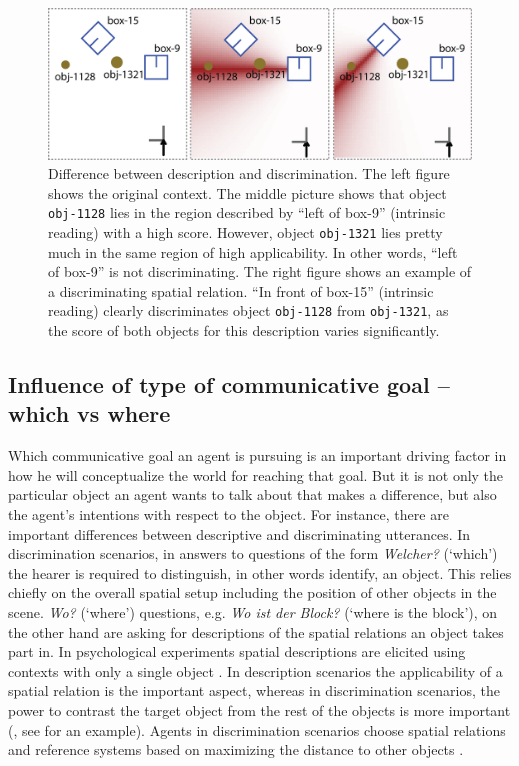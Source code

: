 \begin{figure}
\begin{centering}
\includegraphics[width=.8\columnwidth]{figs/description-vs-discrimination.png}
\end{centering}
\caption[Difference between discrimination and description]
{Difference between description and discrimination. The left figure
shows the original context. The middle picture shows that
object {\footnotesize\tt obj-1128} lies in the region described by ``left of box-9'' 
(intrinsic reading) with a high score. However, object {\footnotesize\tt obj-1321}
lies pretty much in the same region of high applicability. In other words,
``left of box-9'' is not discriminating. The right figure shows an example of
a discriminating spatial relation. ``In front of box-15'' (intrinsic reading) 
clearly discriminates object {\footnotesize\tt obj-1128} from {\footnotesize\tt obj-1321},
as the score of both objects for this description varies significantly.}
\label{f:discrimination-vs-description}
\end{figure}

\subsection{Influence of type of communicative goal -- which vs where}
Which communicative goal an agent is pursuing is an important 
driving factor in how he will conceptualize the world for reaching 
that goal. But it is not only the particular object an agent wants to talk 
about that makes a difference, but also the agent's intentions with 
respect to the object. For instance, there are important differences 
between descriptive and discriminating utterances. 
In discrimination scenarios, in answers to questions 
of the form \textit{Welcher?} (`which') the hearer is required to distinguish, in 
other words identify, an object. This relies chiefly on the overall 
spatial setup including the position of other objects 
in the scene. \textit{Wo?} (`where') questions, e.g. \textit{Wo ist der Block?} (`where is the block'),  
on the other hand are asking for descriptions of the spatial relations an object takes 
part in. In psychological experiments
spatial descriptions are elicited using contexts with only a 
single object \citep{levinson2003space}. 
In description scenarios the applicability
of a spatial relation is the important aspect, 
whereas in discrimination scenarios, the power to contrast the
target object from the rest of the objects is more important 
(\citealt{tenbrink2005identifying}, see  for an example). 
Agents in discrimination scenarios choose spatial relations and
reference systems based on maximizing the distance to other objects
\citep{herskovits1986language}.

